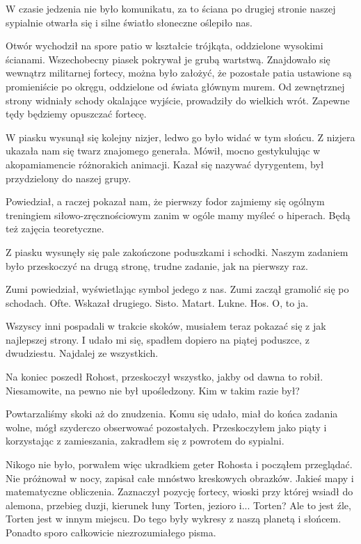 W czasie jedzenia nie było komunikatu, za to ściana po drugiej stronie naszej sypialnie otwarła się i silne światło słoneczne oślepiło nas.

Otwór wychodził na spore patio w kształcie trójkąta, oddzielone wysokimi ścianami.
Wszechobecny piasek pokrywał je grubą wartstwą.
Znajdowało się wewnątrz militarnej fortecy, można było założyć, że pozostałe patia ustawione są promieniście po okręgu, oddzielone od świata głównym murem.
Od zewnętrznej strony widniały schody okalające wyjście, prowadziły do wielkich wrót.
Zapewne tędy będziemy opuszczać fortecę.

W piasku wysunął się kolejny nizjer, ledwo go było widać w tym słońcu.
Z nizjera ukazała nam się twarz znajomego generała.
Mówił, mocno gestykulując w akopamiamencie różnorakich animacji.
Kazał się nazywać dyrygentem, był przydzielony do naszej grupy.

Powiedział, a raczej pokazał nam, że pierwszy fodor zajmiemy się ogólnym treningiem siłowo-zręcznościowym zanim w ogóle mamy myśleć o hiperach.
Będą też zajęcia teoretyczne.

Z piasku wysunęły się pale zakończone poduszkami i schodki.
Naszym zadaniem było przeskoczyć na drugą stronę, trudne zadanie, jak na pierwszy raz.
\begin{dialogue}
\ds{} Zumi \dm{} powiedział, wyświetlając symbol jedego z nas. Zumi zaczął gramolić się po schodach.
\ds{} Ofte. \dm{} Wskazał drugiego.
\ds{} Sisto.
\ds{} Matart.
\ds{} Lukne.
\ds{} Hos. \dm{} O, to ja.
\end{dialogue}
Wszyscy inni pospadali w trakcie skoków, musiałem teraz pokazać się z jak najlepszej strony.
I udało mi się, spadłem dopiero na piątej poduszce, z dwudziestu.
Najdalej ze wszystkich.

Na koniec poszedł Rohost, przeskoczył wszystko, jakby od dawna to robił.
Niesamowite, na pewno nie był upośledzony. Kim w takim razie był?

Powtarzaliśmy skoki aż do znudzenia.
Komu się udało, miał do końca zadania wolne, mógł szyderczo obserwować pozostałych.
Przeskoczyłem jako piąty i korzystając z zamieszania, zakradłem się z powrotem do sypialni.

Nikogo nie było, porwałem więc ukradkiem geter Rohosta i począłem przeglądać.
Nie próżnował w nocy, zapisał całe mnóstwo kreskowych obrazków.
Jakieś mapy i matematyczne obliczenia.
Zaznaczył pozycję fortecy, wioski przy której wsiadł do alemona, przebieg duzji, kierunek łuny Torten, jezioro i... Torten? Ale to jest źle, Torten jest w innym miejscu.
Do tego były wykresy z naszą planetą i słońcem.
Ponadto sporo całkowicie niezrozumiałego pisma.


